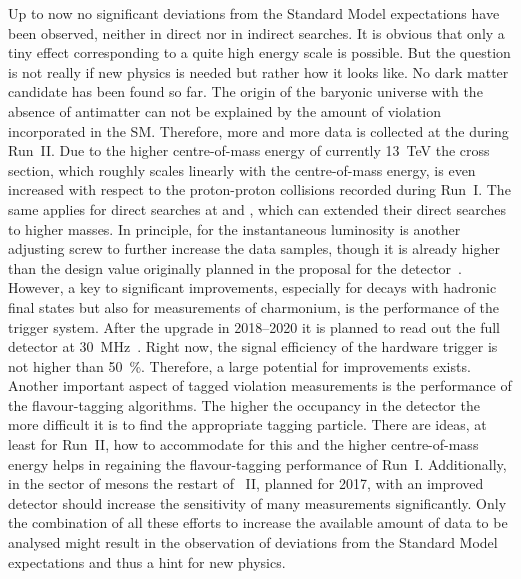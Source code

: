 Up to now no significant deviations from the Standard Model expectations have
been observed, neither in direct nor in indirect searches. It is obvious that
only a tiny effect corresponding to a quite high energy scale is possible. But
the question is not really if new physics is needed but rather how it looks
like. No dark matter candidate has been found so far. The origin of the
baryonic universe with the absence of antimatter can not be explained by the
amount of \CP violation incorporated in the SM. Therefore, more and more data
is collected at the \lhc during Run~II. Due to the higher centre-of-mass
energy of currently \SI{13}{\TeV} the \bbbar cross section, which roughly
scales linearly with the centre-of-mass energy, is even increased with respect
to the proton-proton collisions recorded during Run~I. The same applies for
direct searches at \atlas and \cms, which can extended their direct searches
to higher masses. In principle, for \lhcb the instantaneous luminosity is
another adjusting screw to further increase the data samples, though it is
already higher than the design value originally planned in the proposal for
the detector~\cite{LHCb-Technical-Proposal}. However, a key to significant
improvements, especially for decays with hadronic final states but also for
measurements of charmonium, is the performance of the trigger system. After
the upgrade in 2018--2020 it is planned to read out the full detector at
\SI{30}{\mega\hertz}~\cite{LHCb-TDR-016}. Right now, the signal efficiency of
the hardware trigger is not higher than \SI{50}{\percent}. Therefore, a large
potential for improvements exists. Another important aspect of tagged \CP
violation measurements is the performance of the flavour-tagging algorithms.
The higher the occupancy in the detector the more difficult it is to find the
appropriate tagging particle. There are ideas, at least for Run~II, how to
accommodate for this and the higher centre-of-mass energy helps in regaining
the flavour-tagging performance of Run~I. Additionally, in the sector of \Bz
mesons the restart of \belle~II, planned for 2017, with an improved detector
should increase the sensitivity of many measurements significantly. Only the
combination of all these efforts to increase the available amount of data to
be analysed might result in the observation of deviations from the Standard
Model expectations and thus a hint for new physics.
